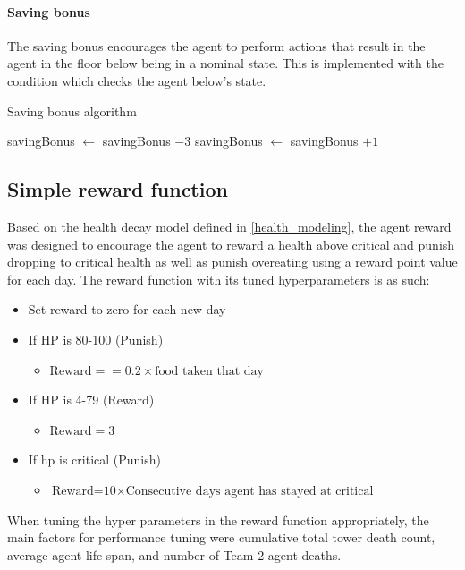 \paragraph{Saving bonus}
The saving bonus encourages the agent to perform actions that result in the agent in the floor below being in a nominal state. This is implemented with the condition which checks the agent below's state.

\begin{algorithm}[H]
\caption{Saving bonus algorithm}
\label{savingbonus-algorithm}
 {
savingBonus $\gets$ savingBonus $-3$\;
}{
savingBonus $\gets$ savingBonus $+1$\;
}
\end{algorithm}

\subsection{Simple reward function}

Based on the health decay model defined in \ref{health_modeling}, the agent reward was designed to encourage the agent to reward a health above critical and punish dropping to critical health as well as punish overeating using a reward point value for each day. The reward function with its tuned hyperparameters is as such:
\begin{itemize}
    \item Set reward to zero for each new day
    \item If HP is 80-100 (Punish)
    \begin{itemize}
        \item $\textrm{Reward} = =0.2\times\textrm{food taken that day}$
    \end{itemize}
    \item If HP is 4-79 (Reward)
    \begin{itemize}
        \item $\textrm{Reward} = 3$
    \end{itemize}
    \item If hp is critical (Punish)
    \begin{itemize}
        \item $\textrm{Reward=10}\times\textrm{Consecutive days agent has stayed at critical}$
    \end{itemize}
\end{itemize}

When tuning the hyper parameters in the reward function appropriately, the main factors for performance tuning were cumulative total tower death count, average agent life span, and number of Team 2 agent deaths. 

